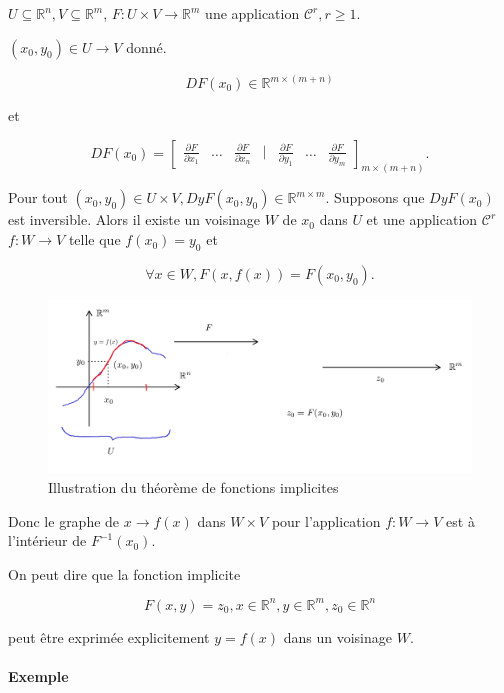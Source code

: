 \documentclass[french]{article}
\begin{document}
\begin{thm}
  $U \subseteq \mathbb{R}^n, V \subseteq \mathbb{R}^m$, $F : U \times V \to \mathbb{R}^m$ une application $\mathcal{C}^r, r \geq 1$.

  $(x_0, y_0) \in U \to V$ donné.

  \[
  DF(x_0) \in \mathbb{R}^{m \times (m+n)}
  \]

  et

  \[
  DF(x_0) = \left[\begin{matrix}
    \frac{\partial F }{\partial x_1} & \dots &\frac{\partial F }{\partial x_n } & \mid & \frac{\partial F }{\partial y_1 } & \dots & \frac{\partial F }{\partial y_m }
  \end{matrix}\right] _{m \times (m+n)}.
  \]

  Pour tout $(x_0, y_0) \in U \times V, DyF(x_0, y_0) \in \mathbb{R}^{m \times m}$. Supposons que $DyF(x_0)$ est inversible. Alors il existe un voisinage $W$ de $x_0$ dans $U$ et une application $\mathcal{C}^r$ $f : W \to V$ telle que $f(x_0) = y_0$ et

  \[
  \forall x \in W, F(x, f(x)) = F(x_0, y_0).
  \]
\end{thm}

\begin{figure}[h!]
  \centering
  \includegraphics[scale=0.3]{figures/fct_impl.png}
  \caption{Illustration du théorème de fonctions implicites}
  \label{}
\end{figure}

Donc le graphe de $x \longrightarrow f(x)$ dans $W \times V$ pour l'application $f: W \to V$ est à l'intérieur de $F ^{-1} (x_0)$.

On peut dire que la fonction implicite

\[
F(x,y) = z_0, x \in \mathbb{R}^n, y \in \mathbb{R}^m, z_0 \in \mathbb{R}^n
\]

peut être exprimée explicitement $y = f(x)$ dans un voisinage $W$.

\paragraph{Exemple}
\end{document}
